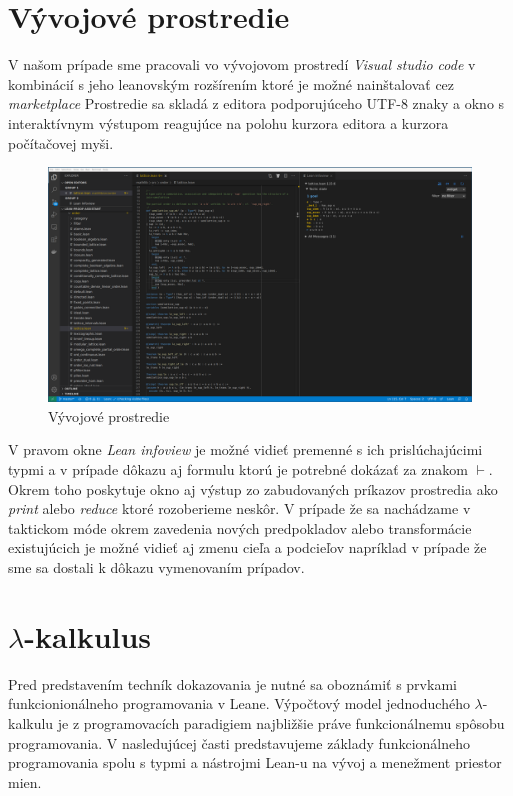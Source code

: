 \documentclass[a4paper,10pt,oneside]{report}%
\begin{document}
\section{Vývojové prostredie}
    V našom prípade sme pracovali vo vývojovom prostredí \emph{Visual studio code}
v kombinácií s jeho leanovským rozšírením ktoré je možné nainštalovať cez
\emph{marketplace} Prostredie sa skladá z editora podporujúceho UTF-8 znaky a okno
s interaktívnym výstupom reagujúce na polohu kurzora editora a kurzora počítačovej
myši.
\begin{center}
    \begin{figure}[!ht]
        \centering
        \includegraphics[scale=0.25]{vscode_printscreen.png}
        \caption{Vývojové prostredie}
    \end{figure}
\end{center}
    V pravom okne \emph{Lean infoview} je možné vidieť premenné s ich prislúchajúcimi
typmi a v prípade dôkazu aj formulu ktorú je potrebné dokázať za znakom $\vdash$.
    Okrem toho poskytuje okno aj výstup zo zabudovaných príkazov prostredia
ako \emph{print} alebo \emph{reduce} ktoré rozoberieme neskôr.
    V prípade že sa nachádzame v taktickom móde okrem zavedenia nových predpokladov
alebo transformácie existujúcich je možné vidieť aj zmenu cieľa a podcieľov
napríklad v prípade že sme sa dostali k dôkazu vymenovaním prípadov.
\section{$\lambda$-kalkulus}
    Pred predstavením techník dokazovania je nutné sa oboznámiť s prvkami funkcionionálneho
programovania v Leane.
    Výpočtový model jednoduchého $\lambda$-kalkulu je z programovacích paradigiem najbližšie práve funkcionálnemu spôsobu programovania.
V nasledujúcej časti predstavujeme základy funkcionálneho programovania spolu
    s typmi a nástrojmi Lean-u na vývoj a menežment priestor mien.
\end{document}
